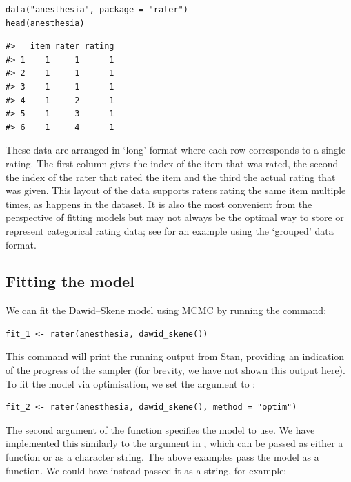 \begin{verbatim}
data("anesthesia", package = "rater")
head(anesthesia)
\end{verbatim}

\begin{verbatim}
#>   item rater rating
#> 1    1     1      1
#> 2    1     1      1
#> 3    1     1      1
#> 4    1     2      1
#> 5    1     3      1
#> 6    1     4      1
\end{verbatim}

These data are arranged in `long' format where each row corresponds to a single
rating. The first column gives the index of the item that was rated, the second
the index of the rater that rated the item and the third the actual rating that
was given. This layout of the data supports raters rating the same item
multiple times, as happens in the dataset. It is also the most convenient from
the perspective of fitting models but may not always be the optimal way to
store or represent categorical rating data; see
 for an example using the `grouped' data
format.

\hypertarget{fitting-the-model}{%
\subsection{Fitting the model}\label{fitting-the-model}}

We can fit the Dawid--Skene model using MCMC by running the command:

\begin{verbatim}
fit_1 <- rater(anesthesia, dawid_skene())
\end{verbatim}

This command will print the running output from Stan, providing an
indication of the progress of the sampler (for brevity, we have not shown this
output here).
To fit the model via optimisation, we set the  argument to
:

\begin{verbatim}
fit_2 <- rater(anesthesia, dawid_skene(), method = "optim")
\end{verbatim}

The second argument of the  function specifies the model to use.
We have implemented this similarly to the  argument in
, which can be passed as either a function or as a character
string. The above examples pass the model as a function. We could have instead
passed it as a string, for example:

